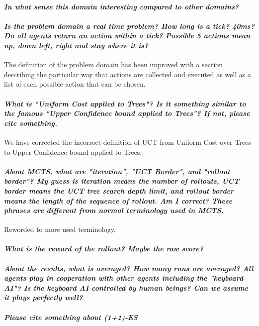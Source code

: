 \documentclass{article}
\begin{document}
\paragraph*{\textit{In what sense this domain interesting compared to other domains?}}


\paragraph*{\textit{Is the problem domain a real time problem? How long is a tick? 40ms? Do all agents return an action within a tick? Possible 5 actions mean up, down left, right and stay where it is?}}
The definition of the problem domain has been improved with a section describing the particular way that actions are collected and executed as well as a list of each possible action that can be chosen.

\paragraph*{\textit{What is "Uniform Cost applied to Trees"? Is it something similar to the famous "Upper Confidence bound applied to Trees"? If not, please cite something.}}
We have corrected the incorrect definition of UCT from Uniform Cost over Trees to Upper Confidence bound applied to Trees.
\paragraph*{\textit{About MCTS, what are "iteration", "UCT Border", and "rollout border"? My guess is iteration means the number of rollouts,
UCT border means the UCT tree search depth limit, and rollout border means the length of the sequence of rollout. Am I correct? These phrases are different from normal terminology used in MCTS.}}
Reworded to more used terminology.
\paragraph*{\textit{What is the reward of the rollout? Maybe the raw score?}}
\paragraph*{\textit{About the results, what is averaged?
How many runs are averaged?
All agents play in cooperation with other agents including the "keyboard AI"?
Is the keyboard AI controlled by human beings?
Can we assume it plays perfectly well?}}
\paragraph*{\textit{Please cite something about (1+1)-ES}}
\end{document}
